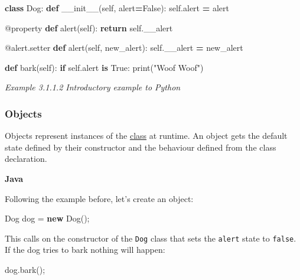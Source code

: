 \documentclass[]{article}
\newenvironment{Shaded}{\begin{snugshade}}{\end{snugshade}}
\newcommand{\KeywordTok}[1]{\textcolor[rgb]{0.13,0.29,0.53}{\textbf{{#1}}}}
\newcommand{\StringTok}[1]{\textcolor[rgb]{0.31,0.60,0.02}{{#1}}}
\newcommand{\FunctionTok}[1]{\textcolor[rgb]{0.00,0.00,0.00}{{#1}}}
\newcommand{\VariableTok}[1]{\textcolor[rgb]{0.00,0.00,0.00}{{#1}}}
\newcommand{\ControlFlowTok}[1]{\textcolor[rgb]{0.13,0.29,0.53}{\textbf{{#1}}}}
\newcommand{\OperatorTok}[1]{\textcolor[rgb]{0.81,0.36,0.00}{\textbf{{#1}}}}
\newcommand{\BuiltInTok}[1]{{#1}}
\newcommand{\AttributeTok}[1]{\textcolor[rgb]{0.77,0.63,0.00}{{#1}}}
\newcommand{\NormalTok}[1]{{#1}}
\begin{document}
\begin{Shaded}
\begin{Highlighting}[]
\KeywordTok{class} \NormalTok{Dog:}
  \KeywordTok{def} \FunctionTok{__init__}\NormalTok{(}\VariableTok{self}\NormalTok{, alert}\OperatorTok{=}\VariableTok{False}\NormalTok{):}
    \VariableTok{self}\NormalTok{.alert }\OperatorTok{=} \NormalTok{alert}

  \AttributeTok{@property}
  \KeywordTok{def} \NormalTok{alert(}\VariableTok{self}\NormalTok{):}
    \ControlFlowTok{return} \VariableTok{self}\NormalTok{.__alert}

  \AttributeTok{@alert.setter}
  \KeywordTok{def} \NormalTok{alert(}\VariableTok{self}\NormalTok{, new_alert):}
    \VariableTok{self}\NormalTok{.__alert }\OperatorTok{=} \NormalTok{new_alert}

  \KeywordTok{def} \NormalTok{bark(}\VariableTok{self}\NormalTok{):}
    \ControlFlowTok{if} \VariableTok{self}\NormalTok{.alert }\KeywordTok{is} \VariableTok{True}\NormalTok{:}
      \BuiltInTok{print}\NormalTok{(}\StringTok{"Woof Woof"}\NormalTok{)}
\end{Highlighting}
\end{Shaded}

\emph{Example 3.1.1.2 Introductory example to Python}

\subsubsection{Objects}\label{objects}

Objects represent instances of the \protect\hyperlink{classes}{class} at
runtime. An object gets the default state defined by their constructor
and the behaviour defined from the class declaration.

\textbf{Java}

Following the example before, let's create an object:

\begin{Shaded}
\begin{Highlighting}[]
\NormalTok{Dog dog = }\KeywordTok{new} \FunctionTok{Dog}\NormalTok{();}
\end{Highlighting}
\end{Shaded}

This calls on the constructor of the \texttt{Dog} class that sets the
\texttt{alert} state to \texttt{false}. If the dog tries to bark nothing
will happen:

\begin{Shaded}
\begin{Highlighting}[]
\NormalTok{dog.}\FunctionTok{bark}\NormalTok{();}
\end{Highlighting}
\end{Shaded}
\end{document}
